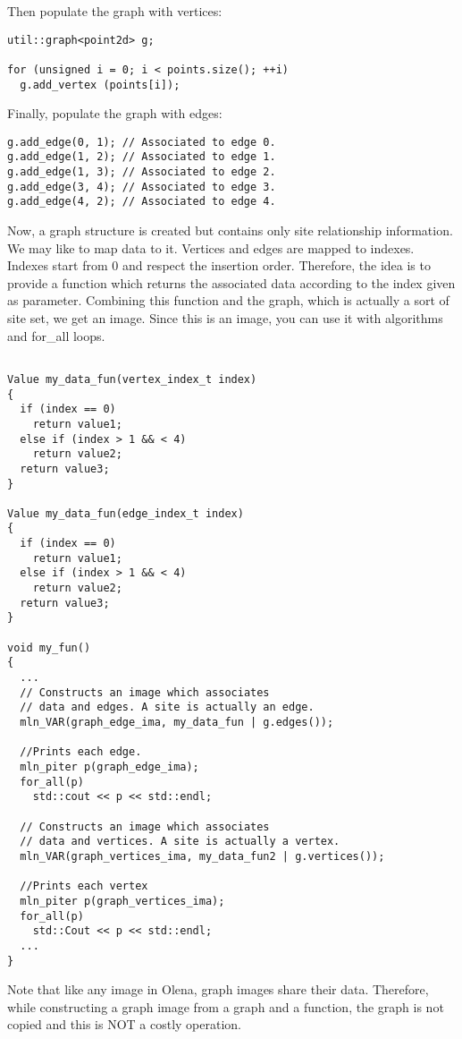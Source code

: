 \documentclass{report}
\begin{document}
Then populate the graph with vertices:
\begin{lstlisting}
util::graph<point2d> g;

for (unsigned i = 0; i < points.size(); ++i)
  g.add_vertex (points[i]);
\end{lstlisting}

Finally, populate the graph with edges:
\begin{lstlisting}
g.add_edge(0, 1); // Associated to edge 0.
g.add_edge(1, 2); // Associated to edge 1.
g.add_edge(1, 3); // Associated to edge 2.
g.add_edge(3, 4); // Associated to edge 3.
g.add_edge(4, 2); // Associated to edge 4.
\end{lstlisting}

Now, a graph structure is created but contains only site relationship
information. We may like to map data to it. Vertices and edges are mapped to
indexes. Indexes start from 0 and respect the insertion order.
Therefore, the idea is to provide a function which returns the associated data
according to the index given as parameter. Combining this function and the
graph, which is actually a sort of site set, we get an image. Since this is an
image, you can use it with algorithms and for\_all loops.

\begin{lstlisting}[frame=single]

Value my_data_fun(vertex_index_t index)
{
  if (index == 0)
    return value1;
  else if (index > 1 && < 4)
    return value2;
  return value3;
}

Value my_data_fun(edge_index_t index)
{
  if (index == 0)
    return value1;
  else if (index > 1 && < 4)
    return value2;
  return value3;
}

void my_fun()
{
  ...
  // Constructs an image which associates
  // data and edges. A site is actually an edge.
  mln_VAR(graph_edge_ima, my_data_fun | g.edges());

  //Prints each edge.
  mln_piter p(graph_edge_ima);
  for_all(p)
    std::cout << p << std::endl;

  // Constructs an image which associates
  // data and vertices. A site is actually a vertex.
  mln_VAR(graph_vertices_ima, my_data_fun2 | g.vertices());

  //Prints each vertex
  mln_piter p(graph_vertices_ima);
  for_all(p)
    std::Cout << p << std::endl;
  ...
}
\end{lstlisting}

Note that like any image in Olena, graph images share their data. Therefore,
while constructing a graph image from a graph and a function, the graph is not
copied and this is NOT a costly operation.
\end{document}
